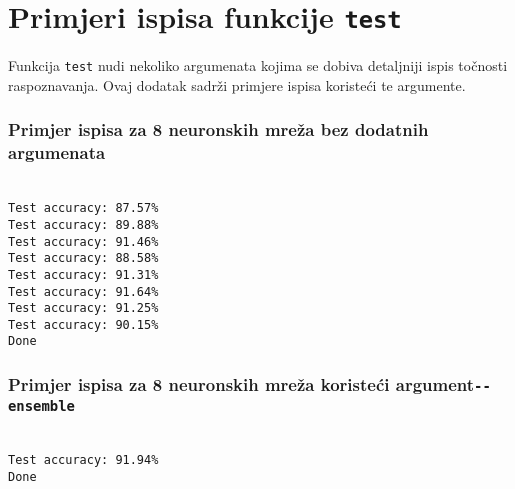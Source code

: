 \chapter{Primjeri ispisa funkcije \texttt{test}}
\label{ch:primjeri-ispisa-funkcije-test}
Funkcija \texttt{test} nudi nekoliko argumenata kojima se dobiva detaljniji ispis točnosti raspoznavanja. Ovaj dodatak
sadrži primjere ispisa koristeći te argumente.

\subsection*{Primjer ispisa za 8 neuronskih mreža bez dodatnih argumenata}
\scriptsize
\texttt{
\\
Test accuracy: 87.57\%\\
Test accuracy: 89.88\%\\
Test accuracy: 91.46\%\\
Test accuracy: 88.58\%\\
Test accuracy: 91.31\%\\
Test accuracy: 91.64\%\\
Test accuracy: 91.25\%\\
Test accuracy: 90.15\%\\
Done\\
}

\texttt{}
\normalsize

\subsection*{Primjer ispisa za 8 neuronskih mreža koristeći argument\newline\texttt{-{}-ensemble}}
\scriptsize
\texttt{
\\
Test accuracy: 91.94\%\\
Done\\
}

\texttt{}
\normalsize
\newpage

